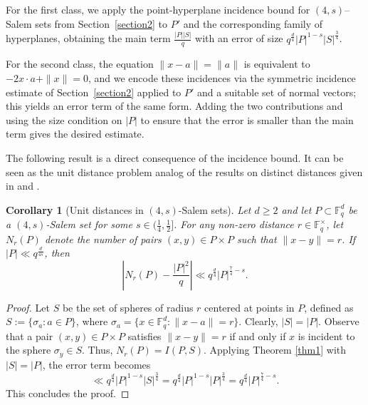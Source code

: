 \documentclass{article}
\newtheorem{corollary}[theorem]{Corollary}
\begin{document}
For the first class, we apply the point-hyperplane incidence bound for $(4,s)$–Salem sets from Section~\ref{section2} to $P'$ and the corresponding family of hyperplanes, obtaining the main term $\frac{|P| |S|}{q}$ with an error of size $q^{\frac{d}{4}}|P|^{1-s}|S|^{\frac{3}{4}}$. 

For the second class, the equation $\|x-a\|=\|a\|$ is equivalent to $-2x\cdot a+\|x\|=0$, and we encode these incidences via the symmetric incidence estimate of Section~\ref{section2} applied to $P'$ and a suitable set of normal vectors; this yields an error term of the same form. Adding the two contributions and using the size condition on $|P|$ to ensure that the error is smaller than the main term gives the desired estimate.

The following result is a direct consequence of the incidence bound. It can be seen as the unit distance problem analog of the results on distinct distances given in \cite{iosevich-Rudnev-07} and \cite{fraser2}.


\begin{corollary}[Unit distances in $(4,s)$-Salem sets]\label{cor:unit-distances}
    Let $d \ge 2$ and let $P \subset \mathbb{F}_q^d$ be a $(4,s)$-Salem set for some $s \in (\frac{1}{4}, \frac{1}{2}]$. For any non-zero distance $r \in \mathbb{F}_q^\times$, let $N_r(P)$ denote the number of pairs $(x,y) \in P \times P$ such that $\|x-y\|=r$. If $|P| \ll q^{\frac{d}{4s}}$, then
    \[
    \left| N_r(P) - \frac{|P|^2}{q} \right| \ll q^{\frac{d}{4}} |P|^{\frac{7}{4}-s}.
    \]
\end{corollary}

\begin{proof}
    Let $S$ be the set of spheres of radius $r$ centered at points in $P$, defined as $S := \{ \sigma_a : a \in P \}$, where $\sigma_a = \{x \in \mathbb{F}_q^d : \|x-a\|=r\}$. Clearly, $|S| = |P|$.
    Observe that a pair $(x,y) \in P \times P$ satisfies $\|x-y\|=r$ if and only if $x$ is incident to the sphere $\sigma_y \in S$. Thus, $N_r(P) = I(P, S)$.
    Applying Theorem \ref{thm1} with $|S|=|P|$, the error term becomes
    \[
    \ll q^{\frac{d}{4}} |P|^{1-s} |S|^{\frac{3}{4}} = q^{\frac{d}{4}} |P|^{1-s} |P|^{\frac{3}{4}} = q^{\frac{d}{4}} |P|^{\frac{7}{4}-s}.
    \]
    This concludes the proof.
\end{proof}
\end{document}
